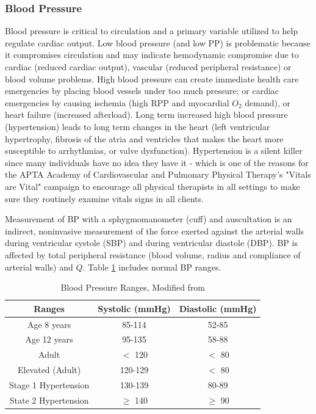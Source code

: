 \subsubsection{Blood Pressure}

Blood pressure is critical to circulation and a primary variable utilized to help regulate cardiac output. Low blood pressure (and low PP) is problematic because it compromises circulation and may indicate hemodynamic compromise due to cardiac (reduced cardiac output), vascular (reduced peripheral resistance) or blood volume problems. High blood pressure can create immediate health care emergencies by placing blood vessels under too much pressure; or cardiac emergencies by causing ischemia (high RPP and myocardial $O_2$ demand), or heart failure (increased afterload). Long term increased high blood pressure (hypertension) leads to long term changes in the heart (left ventricular hypertrophy, fibrosis of the atria and ventricles that makes the heart more susceptible to arrhythmias, or valve dysfunction). Hypertension is a silent killer since many individuals have no idea they have it - which is one of the reasons for the APTA Academy of Cardiovascular and Pulmonary Physical Therapy's "Vitals are Vital" campaign to encourage all physical therapists in all settings to make sure they routinely examine vitals signs in all clients.

Measurement of BP with a sphygmomanometer (cuff) and auscultation is an indirect, noninvasive measurement of the force exerted against the arterial walls during ventricular systole (SBP) and during ventricular diastole (DBP). BP is affected by total peripheral resistance (blood volume, radius and compliance of arterial walls) and $\dot{Q}$. Table \ref{table:BP_Ranges} includes normal BP ranges. 

\begin{table}[h!]
\centering
\begin{tabular}{||c c c ||} 
 \hline
 Ranges & Systolic (mmHg) & Diastolic (mmHg) \\ [0.5ex] 
 \hline\hline
Age 8 years & 85-114  & 52-85  \\ 
Age 12 years & 95-135  & 58-88   \\
Adult & $<$ 120   & $<$ 80   \\
Elevated (Adult) & 120-129   & $<$ 80  \\
Stage 1 Hypertension & 130-139  & 80-89   \\
State 2 Hypertension & $\geq$ 140 &  $\geq$ 90 \\ [1ex] 
 \hline
\end{tabular}
\caption{Blood Pressure Ranges, Modified from \cite{collins_cardiac_2019}}
\label{table:BP_Ranges}
\end{table}

